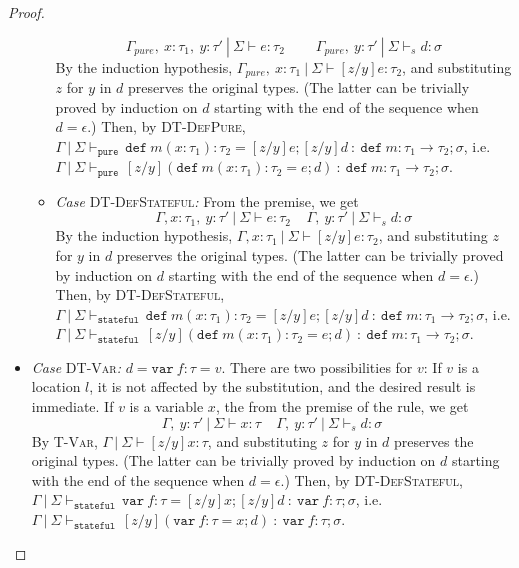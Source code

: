 \documentclass{llncs}
\newcommand{\keywadj}[1]{\mathtt{#1}}
\newcommand{\keyw}[1]{\keywadj{#1}~}
\begin{document}
\begin{proof}
\begin{pcases}
\begin{itemize}
\begin{itemize}
\[\]\[
\Gamma_{pure},~x : \tau_1,~y : \tau'~|~\Sigma \vdash e : \tau_2~~~~~~~~~~\Gamma_{pure},~y : \tau'~|~\Sigma \vdash_s d : \sigma
\]
By the induction hypothesis, $\Gamma_{pure},~x : \tau_1~|~\Sigma \vdash [z/y]e : \tau_2$, and substituting $z$ for $y$ in $d$ preserves the original types. (The latter can be trivially proved by induction on $d$ starting with the end of the sequence when $d = \epsilon$.) Then, by \textsc{DT-DefPure}, $\Gamma~|~\Sigma \vdash_{\keyw{pure}} \keyw{def} m(x : \tau_1) : \tau_2 = [z/y]e; [z/y]d~:~\keyw{def} m : \tau_1 \rightarrow \tau_2; \sigma$, i.e. $\Gamma~|~\Sigma \vdash_{\keyw{pure}} [z/y](\keyw{def} m(x : \tau_1) : \tau_2 = e; d)~:~\keyw{def} m : \tau_1 \rightarrow \tau_2; \sigma$.
\\
\item[] \textit{Case} \textsc{DT-DefStateful}\textit{:} From the premise, we get
\[
\Gamma, x : \tau_1,~y : \tau'~|~\Sigma \vdash e : \tau_2~~~~~\Gamma,~y : \tau'~|~\Sigma \vdash_s d : \sigma
\]
By the induction hypothesis, $\Gamma, x : \tau_1~|~\Sigma \vdash [z/y]e : \tau_2$, and substituting $z$ for $y$ in $d$ preserves the original types. (The latter can be trivially proved by induction on $d$ starting with the end of the sequence when $d = \epsilon$.) Then, by \textsc{DT-DefStateful}, $\Gamma~|~\Sigma \vdash_{\keyw{stateful}} \keyw{def} m(x : \tau_1) : \tau_2 = [z/y]e; [z/y]d~:~\keyw{def} m : \tau_1 \rightarrow \tau_2; \sigma$, i.e. $\Gamma~|~\Sigma \vdash_{\keyw{stateful}} [z/y](\keyw{def} m(x : \tau_1) : \tau_2 = e; d)~:~\keyw{def} m : \tau_1 \rightarrow \tau_2; \sigma$.
\\
\end{itemize}

\item[] \textit{Case} \textsc{DT-Var}\textit{:} $d = \keyw{var} f : \tau = v$. There are two possibilities for $v$: If $v$ is a location $l$, it is not affected by the substitution, and the desired result is immediate. If $v$ is a variable $x$, the from the premise of the rule, we get
\[
\Gamma,~y : \tau'~|~\Sigma \vdash x : \tau~~~~~\Gamma,~y : \tau'~|~\Sigma \vdash_s d : \sigma
\]
By \textsc{T-Var}, $\Gamma~|~\Sigma \vdash [z/y]x : \tau$, and substituting $z$ for $y$ in $d$ preserves the original types. (The latter can be trivially proved by induction on $d$ starting with the end of the sequence when $d = \epsilon$.) Then, by \textsc{DT-DefStateful}, $\Gamma~|~\Sigma \vdash_{\keyw{stateful}} \keyw{var} f : \tau = [z/y]x; [z/y]d~:~\keyw{var} f : \tau; \sigma$, i.e. $\Gamma~|~\Sigma \vdash_{\keyw{stateful}} [z/y](\keyw{var} f : \tau = x; d)~:~\keyw{var} f : \tau; \sigma$.
\\
\end{itemize}


\end{pcases}
\end{proof}
\end{document}
